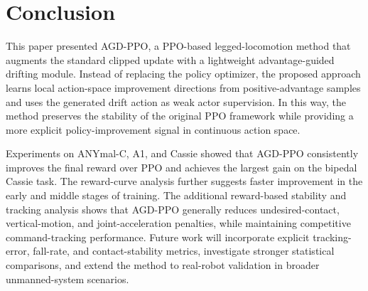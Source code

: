 \documentclass[conference]{IEEEtran}
\begin{document}
\section{Conclusion}
\label{sec:conclusion}

This paper presented AGD-PPO, a PPO-based legged-locomotion method that augments the standard clipped update with a lightweight advantage-guided drifting module. Instead of replacing the policy optimizer, the proposed approach learns local action-space improvement directions from positive-advantage samples and uses the generated drift action as weak actor supervision. In this way, the method preserves the stability of the original PPO framework while providing a more explicit policy-improvement signal in continuous action space.

Experiments on ANYmal-C, A1, and Cassie showed that AGD-PPO consistently improves the final reward over PPO and achieves the largest gain on the bipedal Cassie task. The reward-curve analysis further suggests faster improvement in the early and middle stages of training. The additional reward-based stability and tracking analysis shows that AGD-PPO generally reduces undesired-contact, vertical-motion, and joint-acceleration penalties, while maintaining competitive command-tracking performance. Future work will incorporate explicit tracking-error, fall-rate, and contact-stability metrics, investigate stronger statistical comparisons, and extend the method to real-robot validation in broader unmanned-system scenarios.
\end{document}
